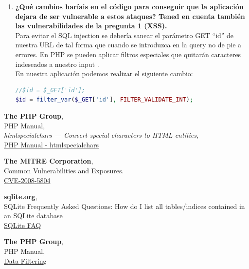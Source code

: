 \documentclass[10pt,a4paper]{article}
\begin{document}
\begin{enumerate}
\item \textbf{¿Qué cambios haríais en el código para conseguir que la aplicación dejara de ser
vulnerable a estos ataques? Tened en cuenta también las vulnerabilidades de la
pregunta 1 (XSS).}\\
Para evitar el SQL injection se debería sanear el parámetro GET ``id'' de nuestra URL de tal forma que cuando se introduzca en la query no de pie a errores. En PHP se pueden aplicar filtros especiales que quitarán caracteres indeseados a nuestro input \cite{filter}.\\
En nuestra aplicación podemos realizar el siguiente cambio:\\
\begin{lstlisting}[language=PHP, firstnumber=23, caption={edit\_players.php},captionpos=b]
//$id = $_GET['id'];
$id = filter_var($_GET['id'], FILTER_VALIDATE_INT);
\end{lstlisting}

\end{enumerate}


\begin{thebibliography}{9}

  \textbf{The PHP Group},\\
  PHP Manual,\\
  \textit{htmlspecialchars — Convert special characters to HTML entities},\\
  \href{https://www.php.net/manual/en/function.htmlspecialchars.php}{PHP Manual - htmlspecialchars}
  
  \textbf{The MITRE Corporation},\\
  Common Vulnerabilities and Exposures.\\
  \href{https://cve.mitre.org/cgi-bin/cvename.cgi?name=CVE-2008-5804}{CVE-2008-5804}

  \textbf{sqlite.org},\\
  SQLite Frequently Asked Questions: How do I list all tables/indices contained in an SQLite database\\
  \href{https://sqlite.org/faq.html#q7}{SQLite FAQ}

  \textbf{The PHP Group},\\
  PHP Manual,\\
  \href{https://php.net/manual/en/book.filter.php}{Data Filtering}
\end{thebibliography}
\end{document}
